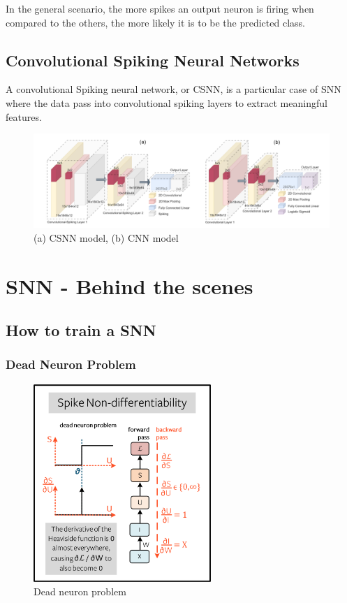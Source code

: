 \documentclass[11pt]{article}
\begin{document}
In the general scenario, the more spikes an output neuron is firing when compared to the others, the more likely it is to be the predicted class.


\subsection{Convolutional Spiking Neural Networks}

A convolutional Spiking neural network, or CSNN, is a particular case of SNN where the data pass into convolutional spiking layers to extract meaningful features.


\begin{figure}[H]
  \centering
  \includegraphics[width=\textwidth]{./image/csnn_template.png}
  \caption{(a) CSNN model, (b) CNN model}
  \label{fig:csnn_template}
\end{figure}

\pagebreak

\section{SNN - Behind the scenes}

\subsection{How to train a SNN}

\subsubsection{Dead Neuron Problem}

\begin{figure}
  \centering
  \includegraphics[width=0.6\textwidth]{./image/non-differentiability.png}
  \caption{Dead neuron problem\cite{eshraghian2021training}}
\end{figure}
\end{document}
